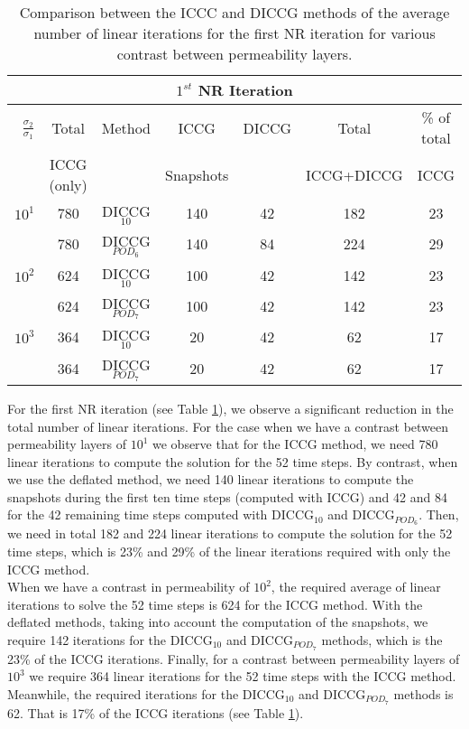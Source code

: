\documentclass[12pt]{article}
\numberwithin{equation}{section}
\begin{document}
\begin{table}[!ht]\centering
\begin{minipage}{1\textwidth}
\vspace{-10pt}
\centering
\begin{tabular}{ ||c|c||c|c|c|c|c||} 

\hline
\multicolumn{7}{|c|}{$1^{st}$ NR Iteration}  \\
\hline\
$\frac{\sigma_2}{\sigma_1}$&Total& Method & ICCG&DICCG &Total&\% of total\\
                           &   ICCG (only)   &  & Snapshots& &ICCG+DICCG& ICCG\\
\hline
$10^{1}$ &780&DICCG$_{10}$ & 140&42& 182&23\\
 &780& DICCG$_{POD_6}$&140&84&  224&29\\
 \hline
$10^{2}$  &624&DICCG$_{10}$ &100&42&  142&23\\
          &624&DICCG$_{POD_7}$&100&42& 142 &23\\
          \hline
 $10^{3}$ &364&DICCG$_{10}$ &20&42  &62& 17\\
          &364&DICCG$_{POD_7}$&20&42&  62&17 \\
 \hline
 \end{tabular}
\caption{Comparison between the ICCC and DICCG methods of the average number of linear iterations for the first NR iteration for various contrast between permeability layers. }\label{table:litertot1}
\end{minipage}
\end{table}
For the first NR iteration (see Table \ref{table:litertot1}), we observe a significant reduction in the total number of linear iterations. 
For the case when we have a contrast between permeability layers of $10^{1}$ we observe that for the ICCG method, we need 780 linear iterations to compute the solution for the 52 time steps. By contrast, when we use the deflated method, we need 140 
linear iterations to compute the snapshots during the first ten time steps (computed with ICCG) and 42 and 84 for the 42 remaining time 
steps computed with DICCG$_{10}$ and DICCG$_{POD_6}$. Then, we need in total 182 and 224 linear iterations to compute the 
solution for the 52 time steps, which is 23\% and 29\% of the linear iterations required with only the ICCG method.\\
When we have a contrast in permeability of $10^{2}$, the required average of linear iterations to solve the 52 
time steps is 624 for the ICCG method. With the deflated methods, taking into account the computation of the snapshots, we require 
142 iterations for the DICCG$_{10}$ and  DICCG$_{POD_7}$ methods, which is the 23\% of the ICCG iterations. 
Finally, for a contrast between permeability layers of $10^{3}$ we require 364 linear iterations for the 52 time steps 
with the ICCG method. Meanwhile, the required iterations for the DICCG$_{10}$ and DICCG$_{POD_7}$ methods is 62. 
That is 17\% of the ICCG iterations (see Table \ref{table:litertot1}).\\
\end{document}
